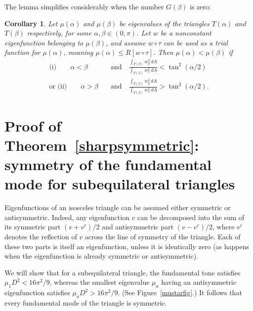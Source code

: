 \documentclass[11pt,reqno]{amsart}
\newtheorem{corollary}[theorem]{Corollary}
\numberwithin{equation}{section}
\begin{document}
The lemma simplifies considerably when the number $G(\beta)$ is zero:
\begin{corollary}\label{corcomp}
Let $\mu(\alpha)$ and $\mu(\beta)$ be eigenvalues of the triangles $T(\alpha)$ and $T(\beta)$ respectively, for some $\alpha, \beta \in (0,\pi)$. Let $w$ be a nonconstant eigenfunction belonging to $\mu(\beta)$, and assume $w\circ\tau$  can be used as a trial function for $\mu(\alpha)$, meaning $\mu(\alpha) \leq R[w \circ \tau]$. Then $\mu(\alpha) < \mu(\beta)$ if
\begin{align*}
\text{(i)} \qquad \alpha<\beta & \quad \text{and} \quad \frac{\int_{T(\beta)} w_y^2 \, dA}{\int_{T(\beta)} w_x^2 \, dA} < \tan^2(\alpha/2) \\
\text{or \ (ii)} \qquad \alpha>\beta & \quad \text{and} \quad \frac{\int_{T(\beta)} w_y^2 \, dA}{\int_{T(\beta)} w_x^2 \, dA} > \tan^2(\alpha/2) .
\end{align*}
\end{corollary}

\section{\bf Proof of Theorem~\ref{sharpsymmetric}: symmetry of the fundamental mode for subequilateral triangles} \label{isec3}

Eigenfunctions of an isosceles triangle can be assumed either symmetric or antisymmetric. Indeed, any eigenfunction $v$ can be decomposed into the sum of its symmetric part $(v+v^r)/2$ and antisymmetric part $(v-v^r)/2$, where $v^r$ denotes the reflection of $v$ across the line of symmetry of the triangle. Each of these two parts is itself an eigenfunction, unless it is identically zero (as happens when the eigenfunction is already symmetric or antisymmetric).

We will show that for a subequilateral triangle, the fundamental tone satisfies $\mu_1 D^2 < 16\pi^2/9$, whereas the smallest eigenvalue $\mu_a$ having an antisymmetric eigenfunction satisfies $\mu_a D^2 > 16\pi^2/9$. (See Figure~\ref{mustarfig}.) It follows that every fundamental mode of the triangle is symmetric.
\end{document}
